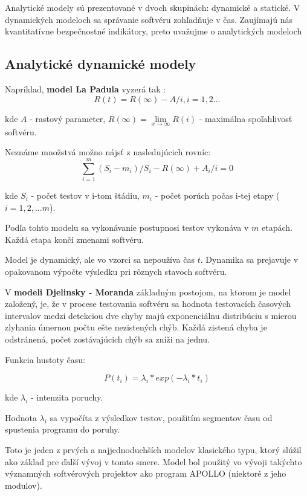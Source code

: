 \documentclass[10pt,twoside,slovak,a4paper]{article}
\begin{document}
Analytické modely sú prezentované v dvoch skupinách: dynamické a statické. V dynamických modeloch sa správanie softvéru zohľadňuje v
čas.
Zaujímajú nás kvantitatívne bezpečnostné indikátory, preto uvažujme o analytických modeloch

\subsection{Analytické dynamické modely}
Napríklad, \textbf{model La Padula} vyzerá tak \cite{vasilenko2004models}:
\begin{equation}\label{formula1}
R(t)=R(\infty) - A/i , i=1,2...
 \end{equation}

kde $A$ - rastový parameter, $R(\infty )= \lim\limits_{x \to \infty} R(i)$ - maximálna spoľahlivosť softvéru.

Neznáme množstvá možno nájsť z nasledujúcich rovníc:
\begin{equation}\label{formula2}
\sum \limits_{i=1}^{m} (S_i - m_i)/S_i - R(\infty ) + A_i/i = 0
 \end{equation}

kde $S_i$ - počet testov v i-tom štádiu, $m_i$ - počet porúch počas i-tej etapy ($i = 1,2,… m$).

Podľa tohto modelu sa vykonávanie postupnosi testov vykonáva v $m$ etapách. Každá etapa končí zmenami softvéru.

Model je dynamický, ale vo vzorci sa nepoužíva čas $t$. Dynamika sa prejavuje v opakovanom výpočte výsledku pri rôznych stavoch softvéru.

V \textbf{modeli Djelinsky - Moranda} základným postojom, na ktorom je model založený, je, že v procese testovania softvéru sa hodnota testovacích časových intervalov medzi detekciou dve chyby majú exponenciálnu distribúciu s mierou zlyhania úmernou počtu ešte nezistených chýb. Každá zistená chyba je odstránená,
počet zostávajúcich chýb sa zníži na jednu.

Funkcia hustoty času:

\begin{equation}\label{formula3}
P(t_i)=\lambda_i *exp(-\lambda_i * t_i)
 \end{equation}

kde $\lambda_i$ - intenzita poruchy.

Hodnota $\lambda_i$ sa vypočíta z výsledkov testov, použitím segmentov času od spustenia programu do poruhy.

Toto je jeden z prvých a najjednoduchších modelov klasického typu, ktorý slúžil ako základ pre ďalší vývoj v tomto smere. Model bol použitý vo vývoji takýchto významných softvérových projektov ako program APOLLO (niektoré z jeho modulov).
\end{document}

